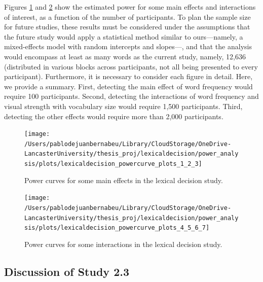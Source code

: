 \documentclass[
  12pt,
  man,floatsintext]{apa7}
\begin{document}
Figures \ref{fig:lexicaldecision-powercurve-plots-1-2-3} and \ref{fig:lexicaldecision-powercurve-plots-4-5-6-7} show the estimated power for some main effects and interactions of interest, as a function of the number of participants. To plan the sample size for future studies, these results must be considered under the assumptions that the future study would apply a statistical method similar to ours---namely, a mixed-effects model with random intercepts and slopes---, and that the analysis would encompass at least as many words as the current study, namely, 12,636 (distributed in various blocks across participants, not all being presented to every participant). Furthermore, it is necessary to consider each figure in detail. Here, we provide a summary. First, detecting the main effect of word frequency would require 100 participants. Second, detecting the interactions of word frequency and visual strength with vocabulary size would require 1,500 participants. Third, detecting the other effects would require more than 2,000 participants.

\begin{figure}

{\centering \texttt{[image: /Users/pablodejuanbernabeu/Library/CloudStorage/OneDrive-LancasterUniversity/thesis\_proj/lexicaldecision/power\_analysis/plots/lexicaldecision\_powercurve\_plots\_1\_2\_3]} 

}

\caption{Power curves for some main effects in the lexical decision study.}\label{fig:lexicaldecision-powercurve-plots-1-2-3}
\end{figure}

\begin{figure}

{\centering \texttt{[image: /Users/pablodejuanbernabeu/Library/CloudStorage/OneDrive-LancasterUniversity/thesis\_proj/lexicaldecision/power\_analysis/plots/lexicaldecision\_powercurve\_plots\_4\_5\_6\_7]} 

}

\caption{Power curves for some interactions in the lexical decision study.}\label{fig:lexicaldecision-powercurve-plots-4-5-6-7}
\end{figure}

\hypertarget{discussion-of-study-2.3}{%
\subsection{Discussion of Study 2.3}\label{discussion-of-study-2.3}}
\end{document}
